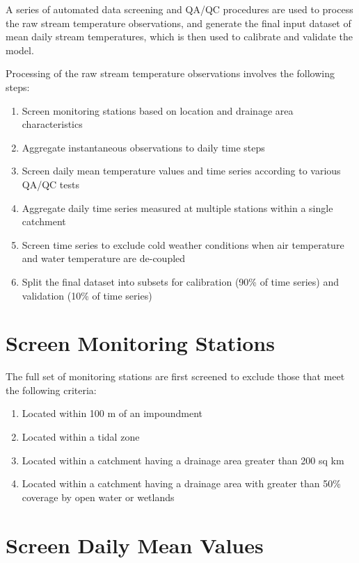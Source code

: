 \documentclass[
]{book}
\providecommand{\tightlist}{%
  \setlength{\itemsep}{0pt}\setlength{\parskip}{0pt}}
\begin{document}
A series of automated data screening and QA/QC procedures are used to process the raw stream temperature observations, and generate the final input dataset of mean daily stream temperatures, which is then used to calibrate and validate the model.

Processing of the raw stream temperature observations involves the following steps:

\begin{enumerate}
\def\labelenumi{\arabic{enumi}.}
\tightlist
\item
  Screen monitoring stations based on location and drainage area characteristics
\item
  Aggregate instantaneous observations to daily time steps
\item
  Screen daily mean temperature values and time series according to various QA/QC tests
\item
  Aggregate daily time series measured at multiple stations within a single catchment
\item
  Screen time series to exclude cold weather conditions when air temperature and water temperature are de-coupled
\item
  Split the final dataset into subsets for calibration (90\% of time series) and validation (10\% of time series)
\end{enumerate}

\section{Screen Monitoring Stations}\label{screen-monitoring-stations}

The full set of monitoring stations are first screened to exclude those that meet the following criteria:

\begin{enumerate}
\def\labelenumi{\arabic{enumi}.}
\tightlist
\item
  Located within 100 m of an impoundment
\item
  Located within a tidal zone
\item
  Located within a catchment having a drainage area greater than 200 sq km
\item
  Located within a catchment having a drainage area with greater than 50\% coverage by open water or wetlands
\end{enumerate}

\section{Screen Daily Mean Values}\label{screen-daily-mean-values}
\end{document}
